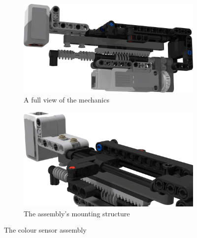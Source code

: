 \documentclass{report}
\begin{document}
	\begin{figure}[H]
		\centering
		\begin{subfigure}[b]{0.43427\textwidth}
			\includegraphics[width=\textwidth]{Resources/Images/rdrColorSensorAssembly.png}
			\caption{A full view of the mechanics}
			\label{fig:rdrColorSensorAssembly}
		\end{subfigure}
		\hspace{10mm}
		\begin{subfigure}[b]{0.4\textwidth}
			\includegraphics[width=\textwidth]{Resources/Images/rdrColorSensorShaftDetail.png}
			\caption{The assembly's mounting structure}
			\label{fig:rdrColorSensorShaftDetail}
		\end{subfigure}
		\caption{The colour sensor assembly}
		\label{fig:rdrColorSensor}
	\end{figure}
	
\end{document}
